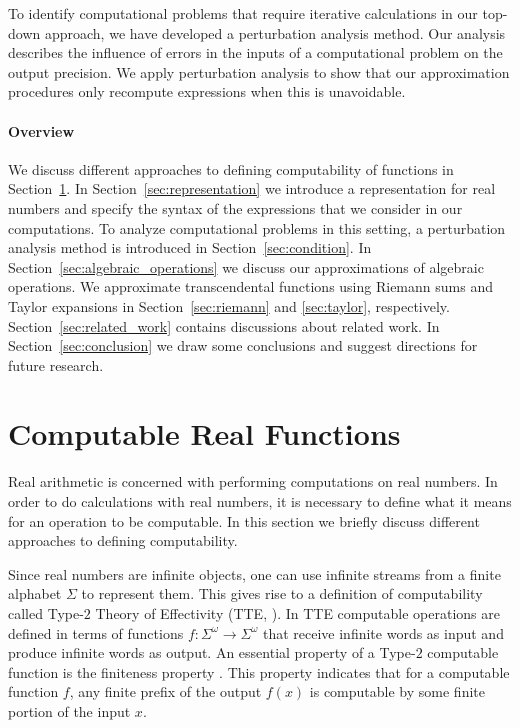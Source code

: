 \documentclass{article}
\numberwithin{mytheorem}{section}
\begin{document}
To identify computational problems that require iterative calculations in our top-down approach, we have developed a perturbation analysis method. Our analysis describes the influence of errors in the inputs of a computational problem on the output precision. We apply perturbation analysis to show that our approximation procedures only recompute expressions when this is unavoidable. 

\paragraph{Overview}
We discuss different approaches to defining computability of functions in Section~\ref{sec:computability}. In Section~\ref{sec:representation} we introduce a representation for real numbers and specify the syntax of the expressions that we consider in our computations. To analyze computational problems in this setting, a perturbation analysis method is introduced in Section~\ref{sec:condition}. In Section~\ref{sec:algebraic_operations} we discuss our approximations of algebraic operations. We approximate transcendental functions using Riemann sums and Taylor expansions in Section~\ref{sec:riemann} and \ref{sec:taylor}, respectively. Section~\ref{sec:related_work} contains discussions about related work. In Section~\ref{sec:conclusion} we draw some conclusions and suggest directions for future research. 




\section{Computable Real Functions}
\label{sec:computability}
Real arithmetic is concerned with performing computations on  real numbers. In order to do calculations with real numbers, it is necessary to define what it means for an  operation to be computable. In this section we briefly discuss different approaches to defining computability. %

Since real numbers are infinite objects, one can use infinite streams from a finite alphabet $\Sigma$ to represent them. This gives rise to a definition of computability called Type-$2$ Theory of Effectivity (TTE, \cite{W12}). In TTE computable operations are defined in terms of functions $f:\Sigma^{\omega}\rightarrow \Sigma^{\omega}$ that receive infinite words as input and produce infinite words as output. An essential property of a Type-$2$ computable function is the finiteness property \cite{W12}. This property indicates that for a computable function $f$, any finite prefix of the output $f(x)$ is computable by some finite portion of the input $x$.
\end{document}
